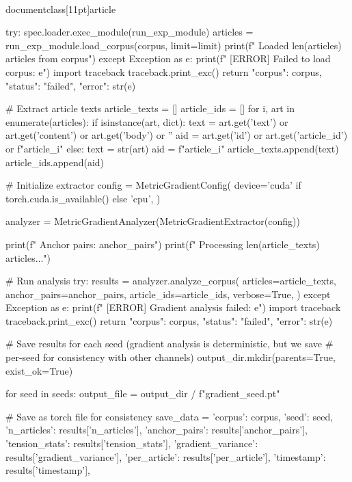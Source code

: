 \\documentclass[11pt]{article}
\begin{document}
\begin{CodeBlock}
    try:
        spec.loader.exec_module(run_exp_module)
        articles = run_exp_module.load_corpus(corpus, limit=limit)
        print(f"  Loaded {len(articles)} articles from {corpus}")
    except Exception as e:
        print(f"  [ERROR] Failed to load corpus: {e}")
        import traceback
        traceback.print_exc()
        return {"corpus": corpus, "status": "failed", "error": str(e)}

    # Extract article texts
    article_texts = []
    article_ids = []
    for i, art in enumerate(articles):
        if isinstance(art, dict):
            text = art.get('text') or art.get('content') or art.get('body') or ''
            aid = art.get('id') or art.get('article_id') or f"article_{i}"
        else:
            text = str(art)
            aid = f"article_{i}"
        article_texts.append(text)
        article_ids.append(aid)

    # Initialize extractor
    config = MetricGradientConfig(
        device='cuda' if torch.cuda.is_available() else 'cpu',
    )

    analyzer = MetricGradientAnalyzer(MetricGradientExtractor(config))

    print(f"  Anchor pairs: {anchor_pairs}")
    print(f"  Processing {len(article_texts)} articles...")

    # Run analysis
    try:
        results = analyzer.analyze_corpus(
            articles=article_texts,
            anchor_pairs=anchor_pairs,
            article_ids=article_ids,
            verbose=True,
        )
    except Exception as e:
        print(f"  [ERROR] Gradient analysis failed: {e}")
        import traceback
        traceback.print_exc()
        return {"corpus": corpus, "status": "failed", "error": str(e)}

    # Save results for each seed (gradient analysis is deterministic, but we save
    # per-seed for consistency with other channels)
    output_dir.mkdir(parents=True, exist_ok=True)

    for seed in seeds:
        output_file = output_dir / f"gradient_{seed}.pt"

        # Save as torch file for consistency
        save_data = {
            'corpus': corpus,
            'seed': seed,
            'n_articles': results['n_articles'],
            'anchor_pairs': results['anchor_pairs'],
            'tension_stats': results['tension_stats'],
            'gradient_variance': results['gradient_variance'],
            'per_article': results['per_article'],
            'timestamp': results['timestamp'],
        }


\end{CodeBlock}
\end{document}
